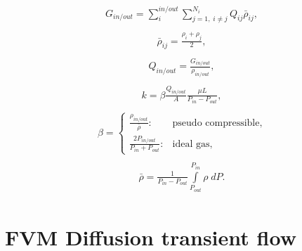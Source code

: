\documentclass[a4paper,12pt]{extreport}
\begin{document}
    \begin{eqnarray}
        \begin{gathered}
            G_{in/out} = \sum_{i}^{in/out} \sum^{N_{i}}_{j=1, \; i\neq j} Q_{ij} \bar{\rho}_{ij},
        \end{gathered}
    \end{eqnarray}
    \begin{eqnarray}
        \begin{gathered}
            \bar{\rho}_{ij} = \frac{\rho_{i}+\rho_{j}}{2},
        \end{gathered}
    \end{eqnarray}
    \begin{eqnarray}
        \begin{gathered}
            Q_{in/out} = \frac{G_{in/out}}{\rho_{in/out}},
        \end{gathered}
    \end{eqnarray}
    \begin{eqnarray}
        \begin{gathered}
            k = \beta \frac{Q_{in/out}}{A} \frac{\mu L}{P_{in} - P_{out}},
        \end{gathered}
    \end{eqnarray}
    \begin{eqnarray}
        \begin{gathered}
            \beta =\begin{cases}
                       \frac{\rho_{in/out}}{\bar{\rho}}: &\text{pseudo compressible},\\
                       \frac{2P_{in/out}}{P_{in} + P_{out}}: &\text{ideal gas},
            \end{cases}
        \end{gathered}
    \end{eqnarray}
    \begin{eqnarray}
        \begin{gathered}
            \bar{\rho}=\frac{1}{P_{in}-P_{out}} \int\limits^{P_{in}}_{P_{out}}\rho \; dP.
        \end{gathered}
    \end{eqnarray}

    \section*{FVM Diffusion transient flow}
\end{document}
